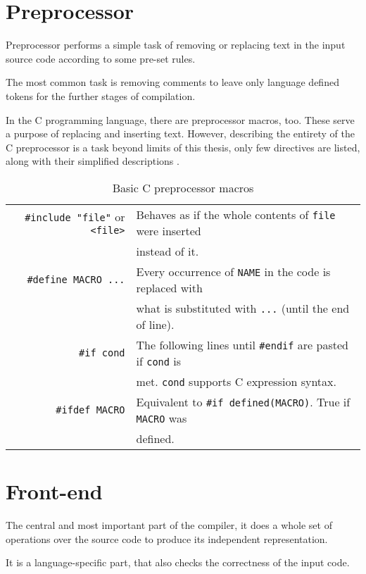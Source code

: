     \section{Preprocessor}

    Preprocessor performs a simple task of removing or replacing text in the input source code according to some pre-set rules.

    The most common task is removing comments to leave only language defined tokens for the further stages of compilation.

    In the C programming language, there are preprocessor macros, too. These serve a purpose of replacing and inserting text. However, describing the entirety of the C preprocessor is a task beyond limits of this thesis, only few directives are listed, along with their simplified descriptions \cite{GnuCppWeb}.

    \begin{table}[H]
    \begin{tabular}{r|l}
        \verb|#include "file"| or \verb|<file>| & Behaves as if the whole contents of \verb|file| were inserted \\
        & instead of it.\\
        \verb|#define MACRO ...| & Every occurrence of \verb|NAME| in the code is replaced with \\
        & what is substituted with \verb|...| (until the end of line).\\
        \verb|#if cond| & The following lines until \verb|#endif| are pasted if \verb|cond| is\\
        & met. \verb|cond| supports C expression syntax.\\
        \verb|#ifdef MACRO| & Equivalent to \verb|#if defined(MACRO)|. True if \verb|MACRO| was\\
        & defined.
    \end{tabular}
    \caption{Basic C preprocessor macros}
    \end{table}

    \section{Front-end}

        The central and most important part of the compiler, it does a whole set of operations over the source code to produce its independent representation.

        It is a language-specific part, that also checks the correctness of the input code.

